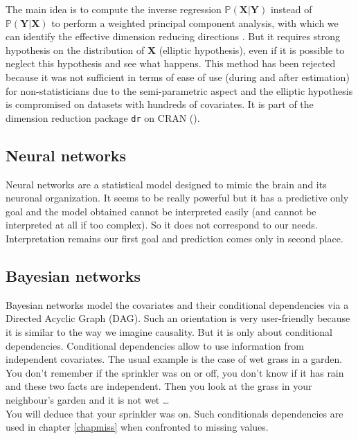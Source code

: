 \documentclass[12pt,a4paper]{report}
\begin{document}
		The main idea is to compute the inverse regression $\mathbb{P}(\boldsymbol{X}|\boldsymbol{Y})$ instead of $\mathbb{P}(\boldsymbol{Y}|\boldsymbol{X})$ to perform a weighted principal component analysis, with which we can identify the effective dimension reducing directions \cite{li1991sliced}. But it requires strong hypothesis on the distribution of $\boldsymbol{X}$ (elliptic hypothesis), even if it is possible to neglect this hypothesis \cite{saracco1999regression} and see what happens. This method has been rejected because it was not sufficient in terms of ease of use (during and after estimation) for non-statisticians due to the semi-parametric aspect and the elliptic hypothesis is compromised on datasets with hundreds of covariates. It is part of the dimension reduction package {\tt dr} on CRAN (\cite{packagedr}).
		
	
	\subsection{Neural networks}	
		Neural networks \cite{fausett1994fundamentals} are a statistical model designed to mimic the brain and its neuronal organization. It seems to be really powerful but it has a predictive only goal and the model obtained cannot be interpreted easily (and cannot be interpreted at all if too complex). So it does not correspond to our needs. Interpretation remains our first goal and prediction comes only in second place.
		
	\subsection{Bayesian networks}
		
		Bayesian networks \cite{heckerman1995learning,jensen2007bayesian,friedman2000using} model the covariates and their conditional dependencies via a Directed Acyclic Graph (DAG). Such an orientation is very user-friendly because it is similar to the way we imagine causality. But it is only about conditional dependencies. Conditional dependencies allow to use information from independent covariates. The usual example is the case of wet grass in a garden. You don't remember if the sprinkler was on or off, you don't know if it has rain and these two facts are independent. Then you look at the grass in your neighbour's garden and it is not wet \dots \\
		You will deduce that your sprinkler was on. Such conditionals dependencies are used in chapter \ref{chapmiss} when confronted to missing values. \\
		
\end{document}
